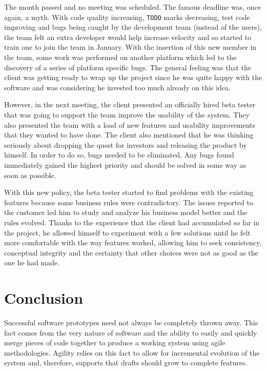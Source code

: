 \documentclass[lnbip]{svmultln}
\begin{document}
The month passed and no meeting was scheduled. The famous deadline
was, once again, a myth. With code quality increasing, \texttt{TODO}
marks decreasing, test code improving and bugs being caught by the
development team (instead of the users), the team felt an extra
developer would help increase velocity and so started to train one to
join the team in January. With the insertion of this new member in the
team, some work was performed on another platform which led to the
discovery of a series of platform specific bugs. The general feeling
was that the client was getting ready to wrap up the project since he
was quite happy with the software and was considering he invested too
much already on this idea.

However, in the next meeting, the client presented an officially hired
beta tester that was going to support the team improve the usability
of the system. They also presented the team with a load of new
features and usability improvements that they wanted to have done. The
client also mentioned that he was thinking seriously about dropping
the quest for investors and releasing the product by himself. In order
to do so, bugs needed to be eliminated. Any bugs found immediately
gained the highest priority and should be solved in some way as soon
as possible.

With this new policy, the beta tester started to find problems with the
existing features because some business rules were contradictory. The issues reported
to the customer led him to study and analyze his business model
better and the rules evolved. Thanks to the experience that the client
had accumulated so far in the project, he allowed himself to
experiment with a few solutions until he felt more comfortable with the way
features worked, allowing him to seek consistency, conceptual
integrity and the certainty that other choices were not as good as the
one he had made.

\section{Conclusion}
\label{sec:conclusion}

Successful software prototypes need not always be completely thrown
away. This fact comes from the very nature of software and the ability
to easily and quickly merge pieces of code together to produce a
working system using agile methodologies. Agility relies on this fact to allow for incremental
evolution of the system and, therefore, supports that drafts should
grow to complete features.
\end{document}
